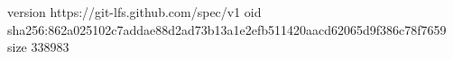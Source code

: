 version https://git-lfs.github.com/spec/v1
oid sha256:862a025102c7addae88d2ad73b13a1e2efb511420aacd62065d9f386c78f7659
size 338983
